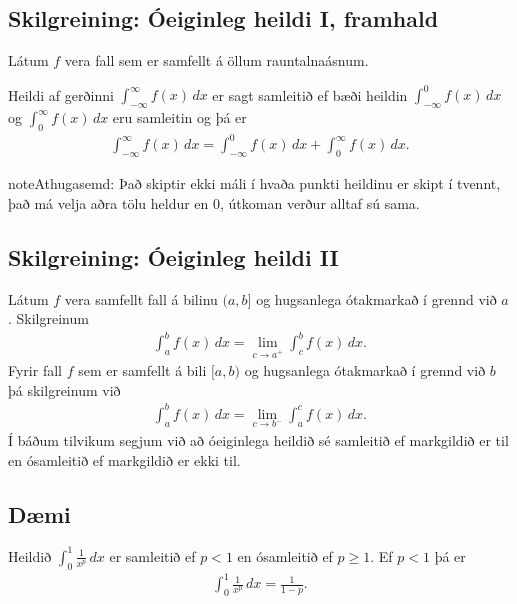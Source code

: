 \documentclass[b5paper,11pt,icelandic]{sphinxmanual}
\begin{document}
\subsection{Skilgreining: Óeiginleg heildi I, framhald}
\label{kafli06:skilgreining-oeiginleg-heildi-i-framhald}
Látum \(f\) vera fall sem er samfellt á öllum rauntalnaásnum.

Heildi af gerðinni \(\int_{-\infty}^\infty f(x)\,dx\) er sagt
samleitið ef bæði heildin \(\int_{-\infty}^0 f(x)\,dx\) og
\(\int_0^\infty f(x)\,dx\) eru samleitin og þá er
\begin{equation*}
\begin{split}\int_{-\infty}^\infty f(x)\,dx=\int_{-\infty}^0 f(x)\,dx +
  \int_0^\infty f(x)\,dx.\end{split}
\end{equation*}
\begin{notice}{note}{Athugasemd:}
Það skiptir ekki máli í hvaða punkti heildinu er skipt í tvennt, það má
velja aðra tölu heldur en 0, útkoman verður alltaf sú sama.
\end{notice}


\subsection{Skilgreining: Óeiginleg heildi II}
\label{kafli06:skilgreining-oeiginleg-heildi-ii}
Látum \(f\) vera samfellt fall á bilinu \((a, b]\) og hugsanlega
ótakmarkað í grennd við \(a\). Skilgreinum
\begin{equation*}
\begin{split}\int_a^b f(x)\,dx=\lim_{c\rightarrow a^+} \int_c^b f(x)\,dx.\end{split}
\end{equation*}
Fyrir fall \(f\) sem er samfellt á bili \([a, b)\) og hugsanlega
ótakmarkað í grennd við \(b\) þá skilgreinum við
\begin{equation*}
\begin{split}\int_a^b f(x)\,dx=\lim_{c\rightarrow b^-} \int_a^c f(x)\,dx.\end{split}
\end{equation*}
Í báðum tilvikum segjum við að óeiginlega heildið sé samleitið ef
markgildið er til en ósamleitið ef markgildið er ekki til.


\subsection{Dæmi}
\label{kafli06:id9}
Heildið \(\int_0^1 \frac{1}{x^p}\,dx\) er samleitið ef \(p<1\)
en ósamleitið ef \(p\geq 1\). Ef \(p<1\) þá er
\begin{equation*}
\begin{split}\int_0^1
\frac{1}{x^p}\,dx=\frac{1}{1-p}.\end{split}
\end{equation*}
\end{document}
